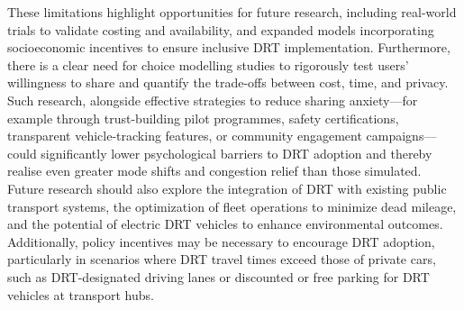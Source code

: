 \documentclass[main.tex]{subfiles}
\begin{document}
These limitations highlight opportunities for future research, including real-world trials to validate costing and availability, and expanded models incorporating socioeconomic incentives to ensure inclusive DRT implementation. Furthermore, there is a clear need for choice modelling studies to rigorously test users' willingness to share and quantify the trade-offs between cost, time, and privacy. Such research, alongside effective strategies to reduce sharing anxiety—for example through trust-building pilot programmes, safety certifications, transparent vehicle-tracking features, or community engagement campaigns—could significantly lower psychological barriers to DRT adoption and thereby realise even greater mode shifts and congestion relief than those simulated. Future research should also explore the integration of DRT with existing public transport systems, the optimization of fleet operations to minimize dead mileage, and the potential of electric DRT vehicles to enhance environmental outcomes. Additionally, policy incentives may be necessary to encourage DRT adoption, particularly in scenarios where DRT travel times exceed those of private cars, such as DRT-designated driving lanes or discounted or free parking for DRT vehicles at transport hubs.
\end{document}
